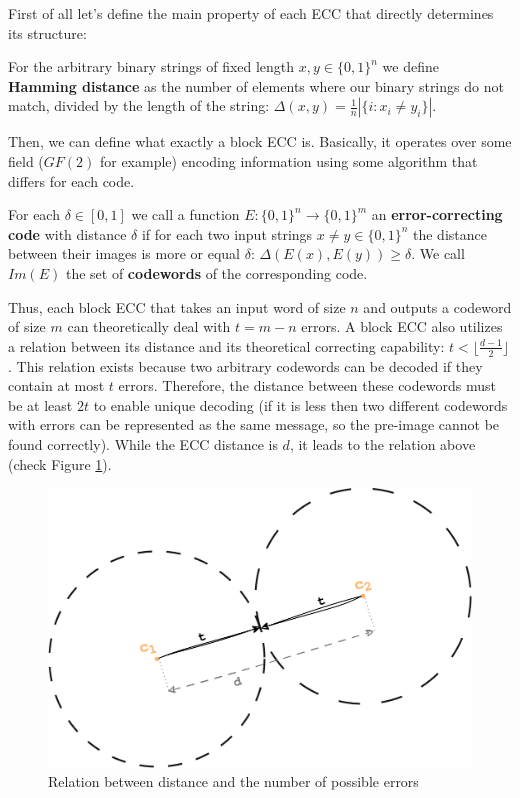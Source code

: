 \documentclass[../lecture-notes.tex]{subfiles}
\begin{document}
First of all let's define the main property of each ECC that directly determines its structure:
\begin{definition}
For the arbitrary binary strings of fixed length $x, y \in \{0, 1\}^n$ we define \textbf{Hamming distance} as the 
number of elements where our binary strings do not match, divided by the length of the string: 
$\Delta(x,y) = \frac{1}{n}|\{i: x_i \neq y_i\}|$.
\end{definition}
Then, we can define what exactly a block ECC is. Basically, it operates over some field ($GF(2)$ for example) encoding 
information using some algorithm that differs for each code.
\begin{definition}
For each $\delta \in [0, 1]$ we call a function $E: \{0, 1\}^n \rightarrow \{0, 1\}^m$ an 
\textbf{error-correcting code} with distance $\delta$ if for each two input strings $x \neq y \in \{0, 1\}^n$ the 
distance between their images is more or equal $\delta$: $\Delta(E(x), E(y)) \geq \delta$. We call $Im(E)$  the set 
of \textbf{codewords} of the corresponding code.
\end{definition}
Thus, each block ECC that takes an input word of size $n$ and outputs a codeword of size $m$ can theoretically deal 
with $t = m-n$ errors. A block ECC also utilizes a relation between its distance and its theoretical correcting 
capability: $t < \lfloor \frac{d-1}{2} \rfloor$. This relation exists because two arbitrary codewords can be decoded 
if they contain at most $t$ errors. Therefore, the distance between these codewords must be at least $2t$ to enable 
unique decoding (if it is less then two different codewords with errors can be represented as the same message, so the 
pre-image cannot be found correctly). While the ECC distance is $d$, it leads to the relation above 
(check Figure \ref{fig:distance}).
\begin{figure}[H]
    \centering
    \includegraphics[width=0.5\linewidth]{images/lecture_14/circles.png}
    \caption{Relation between distance and the number of possible errors}
    \label{fig:distance}
\end{figure}
\end{document}
